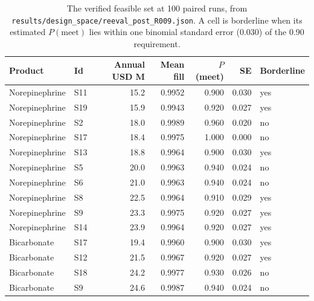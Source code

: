 \begin{table}[htbp]
\centering
\caption{The verified feasible set at 100 paired runs, from
\texttt{results/design\_space/reeval\_post\_R009.json}. A cell is borderline when its estimated
$P(\text{meet})$ lies within one binomial standard error (0.030) of the 0.90 requirement.}
\label{tab:feasible}
\footnotesize
\setlength{\tabcolsep}{5pt}
\begin{tabular}{@{}llrrrrl@{}}
\toprule
Product & Id & Annual USD M & Mean fill & $P$(meet) & SE & Borderline \\
\midrule
Norepinephrine & S11 & 15.2 & 0.9952 & 0.900 & 0.030 & yes \\
Norepinephrine & S19 & 15.9 & 0.9943 & 0.920 & 0.027 & yes \\
Norepinephrine & S2 & 18.0 & 0.9989 & 0.960 & 0.020 & no \\
Norepinephrine & S17 & 18.4 & 0.9975 & 1.000 & 0.000 & no \\
Norepinephrine & S13 & 18.8 & 0.9964 & 0.900 & 0.030 & yes \\
Norepinephrine & S5 & 20.0 & 0.9963 & 0.940 & 0.024 & no \\
Norepinephrine & S6 & 21.0 & 0.9963 & 0.940 & 0.024 & no \\
Norepinephrine & S8 & 22.5 & 0.9964 & 0.910 & 0.029 & yes \\
Norepinephrine & S9 & 23.3 & 0.9975 & 0.920 & 0.027 & yes \\
Norepinephrine & S14 & 23.9 & 0.9964 & 0.920 & 0.027 & yes \\
Bicarbonate & S17 & 19.4 & 0.9960 & 0.900 & 0.030 & yes \\
Bicarbonate & S12 & 21.5 & 0.9967 & 0.920 & 0.027 & yes \\
Bicarbonate & S18 & 24.2 & 0.9977 & 0.930 & 0.026 & no \\
Bicarbonate & S9 & 24.6 & 0.9987 & 0.940 & 0.024 & no \\
\bottomrule
\end{tabular}
\end{table}

